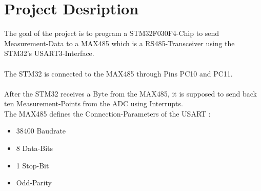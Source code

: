 \section{Project Desription}

The goal of the project is to program a STM32F030F4-Chip to send Measurement-Data
to a MAX485 which is a RS485-Transceiver using the STM32's USART3-Interface.\\ \\
The STM32 is connected to the MAX485 through Pins PC10 and PC11.\\ \\
After the STM32 receives a Byte from the MAX485, it is supposed to send back
ten Measurement-Points from the ADC using Interrupts.\\
The MAX485 defines the Connection-Parameters of the USART :
\begin{itemize}
	\item 38400 Baudrate
	\item 8 Data-Bits
	\item 1 Stop-Bit
	\item Odd-Parity
\end{itemize}
